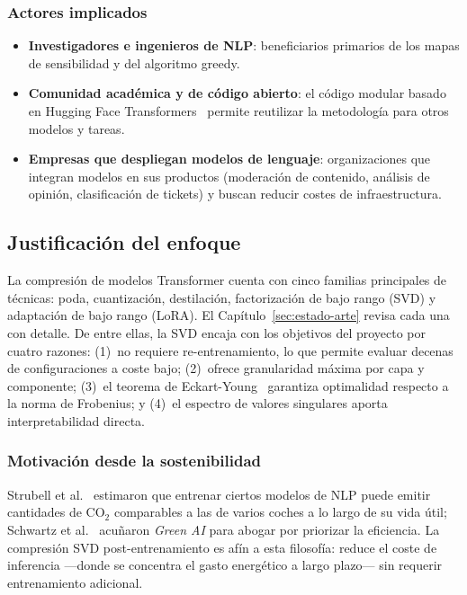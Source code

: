 \subsubsection{Actores implicados}

\begin{itemize}[nosep]
    \item \textbf{Investigadores e ingenieros de NLP}: beneficiarios
    primarios de los mapas de sensibilidad y del algoritmo greedy.
    \item \textbf{Comunidad académica y de código abierto}: el código
    modular basado en Hugging Face Transformers~\cite{wolf2020transformers}
    permite reutilizar la metodología para otros modelos y tareas.
    \item \textbf{Empresas que despliegan modelos de lenguaje}:
    organizaciones que integran modelos en sus productos (moderación
    de contenido, análisis de opinión, clasificación de tickets) y
    buscan reducir costes de infraestructura.
\end{itemize}


\subsection{Justificación del enfoque}
\label{sec:gep-justificacion}

La compresión de modelos Transformer cuenta con cinco familias
principales de técnicas: poda, cuantización, destilación, factorización
de bajo rango (SVD) y adaptación de bajo rango (LoRA). El
Capítulo~\ref{sec:estado-arte} revisa cada una con detalle. De entre
ellas, la SVD encaja con los objetivos del proyecto por cuatro razones:
(1)~no requiere re-entrenamiento, lo que permite evaluar decenas de
configuraciones a coste bajo; (2)~ofrece granularidad máxima por capa y
componente; (3)~el teorema de Eckart-Young~\cite{eckart1936approximation}
garantiza optimalidad respecto a la norma de Frobenius; y (4)~el
espectro de valores singulares aporta interpretabilidad directa.

\subsubsection{Motivación desde la sostenibilidad}

Strubell et al.~\cite{strubell2019energy} estimaron que entrenar ciertos
modelos de NLP puede emitir cantidades de CO$_2$ comparables a las de
varios coches a lo largo de su vida útil; Schwartz et
al.~\cite{schwartz2020green} acuñaron \emph{Green AI} para abogar por
priorizar la eficiencia. La compresión SVD post-entrenamiento es
afín a esta filosofía: reduce el coste de inferencia ---donde se
concentra el gasto energético a largo plazo--- sin requerir
entrenamiento adicional.



